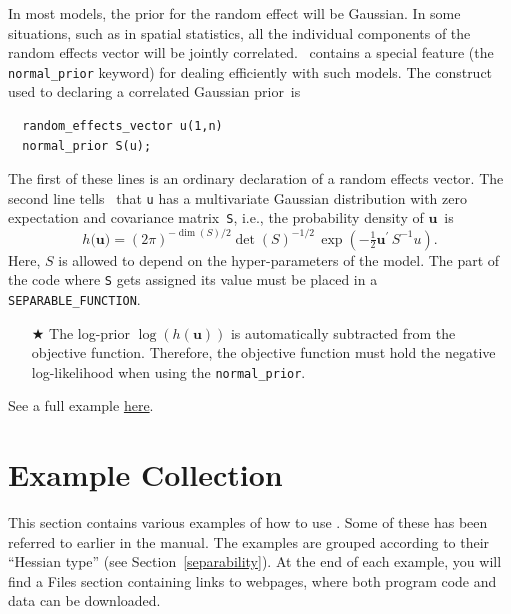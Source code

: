 \documentclass{admbmanual}
\begin{document}
In most models, the prior for the random effect will be Gaussian. In some
situations, such as in spatial statistics, all the individual components of the
random effects vector will be jointly correlated. \scAB\ contains a special
feature (the \texttt{normal\_prior} keyword) for dealing efficiently with such
models. The construct used to declaring a correlated Gaussian prior~is
\begin{lstlisting}
  random_effects_vector u(1,n)
  normal_prior S(u);
\end{lstlisting}
The first of these lines is an ordinary declaration of a random effects vector.
The second line tells \scAB\ that \texttt{u} has a multivariate Gaussian
distribution with zero expectation and covariance matrix~\texttt{S}, i.e., the
probability density of $\mathbf{u}$~is
\[
h(\mathbf{u)=}\left( 2\pi \right) ^{-\dim(S)/2}\det (S)^{-1/2}\,
\exp \left( - \tfrac{1}{2}\mathbf{u}^{\prime} \, S^{-1}u\right) .
\]
Here, $S$ is allowed to depend on the hyper-parameters of the model. The part of
the code where \texttt{S} gets assigned its value must be placed in a
\texttt{SEPARABLE\_FUNCTION}. %
\begin{itemize}
  \item[$\bigstar$] The log-prior $\log \left( h\left( \mathbf{u}\right) \right)
  $ is automatically subtracted from the objective function. Therefore, the
  objective function must hold the negative log-likelihood when using the
  \texttt{normal\_prior}.
\end{itemize}
See a full example
\href{http://otter-rsch.com/admbre/examples/spatial/spatial.html}{here}.

\appendix

\chapter{Example Collection}
\label{sec:example_collection}

This section contains various examples of how to use \scAR. Some of these has
been referred to earlier in the manual. The examples are grouped according to
their ``Hessian type'' (see Section~\ref{separability}). At the end of each
example, you will find a Files section containing links to webpages, where both
program code and data can be downloaded.
\end{document}
